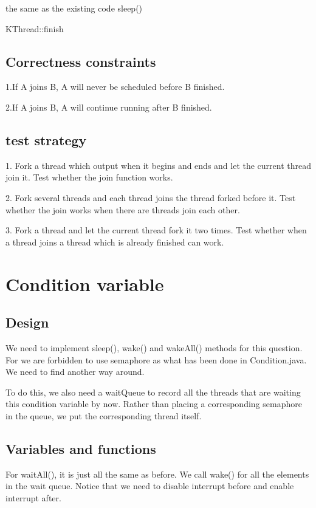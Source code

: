 \documentclass[a4paper,10pt]{article}
\begin{document}
\begin{algorithm}
\DontPrintSemicolon %
the same as the existing code\;
sleep()
\caption{KThread::finish}
\label{algo:change}
\end{algorithm}

\subsection{Correctness constraints}

1.If A joins B, A will never be scheduled before B finished.

2.If A joins B, A will continue running after B finished.

\subsection{test strategy}

1. Fork a thread which output when it begins and ends and let the current thread join it. Test whether the join function works.

2. Fork several threads and each thread joins the thread forked before it. Test whether the join works when there are threads join each other.

3. Fork a thread and let the current thread fork it two times. Test whether when a thread joins a thread which is already finished can work.

\section{Condition variable}

\subsection {Design}

We need to implement sleep(), wake() and wakeAll() methods for this question. For we are forbidden to use semaphore as what has been done in Condition.java. We need to find another way around.

To do this, we also need a waitQueue to record all the threads that are waiting this condition variable by now. Rather than placing a corresponding semaphore in the queue, we put the corresponding thread itself.

\subsection{Variables and functions}
For waitAll(), it is just all the same as before. We call wake() for all the elements in the wait queue. Notice that we need to disable interrupt before and enable interrupt after.
\end{document}
